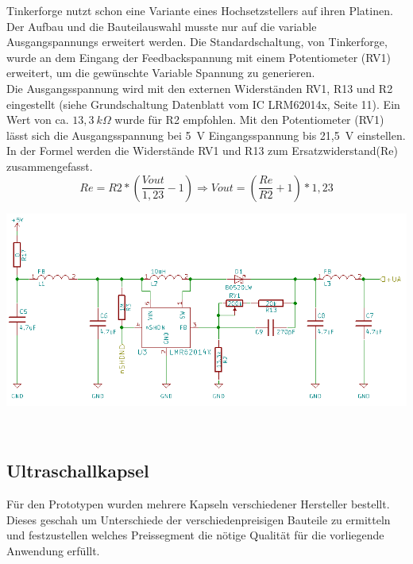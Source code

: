 Tinkerforge nutzt schon eine Variante eines Hochsetzstellers auf ihren Platinen. Der Aufbau und die Bauteilauswahl musste nur auf die variable Ausgangspannungs erweitert werden. Die Standardschaltung, von Tinkerforge, wurde an dem Eingang der Feedbackspannung mit einem Potentiometer (RV1) erweitert, um die gewünschte Variable Spannung zu generieren.\\
Die Ausgangsspannung wird mit den externen Widerständen RV1, R13 und R2 eingestellt (siehe Grundschaltung Datenblatt vom IC LRM62014x, Seite 11). Ein Wert von ca. \(\displaystyle 13,3~k\Omega \) wurde für R2 empfohlen. Mit den Potentiometer (RV1) lässt sich die Ausgangsspannung bei 5~V Eingangsspannung bis 21,5~V einstellen. In der Formel werden die Widerstände RV1 und R13 zum Ersatzwiderstand(Re) zusammengefasst.
\onehalfspacing \\
\[\displaystyle Re=R2*\left(\frac{Vout}{1,23}-1\right) \Rightarrow Vout=\left(\frac{Re}{R2}+1\right)*1,23\] 
\singlespacing
\begin{center}
\begin{minipage}{0.75\textwidth}
\includegraphics[width=1\textwidth%
]{Abbildungen/Pumpe.png}
\label{fig:Hochsetzsteller}
\end{minipage}\\
\end{center}

\subsection{Ultraschallkapsel}%
Für den Prototypen wurden mehrere Kapseln verschiedener Hersteller bestellt. Dieses geschah um Unterschiede der verschiedenpreisigen Bauteile zu ermitteln und festzustellen welches Preissegment die nötige Qualität für die vorliegende Anwendung erfüllt.


